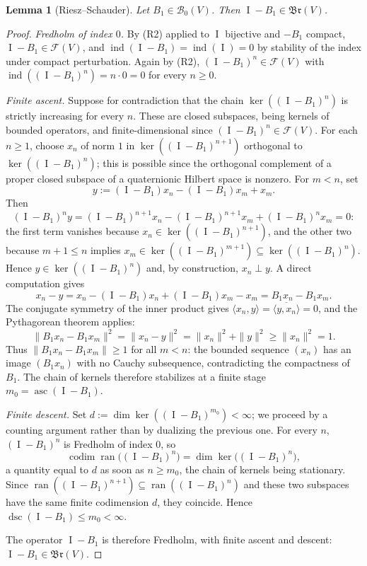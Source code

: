\documentclass[11pt,a4paper]{article}
\theoremstyle{plain}
\newtheorem{lemma}{Lemma}[section]
\theoremstyle{remark}
\newcommand{\V}{V}
\newcommand{\Bo}{\mathcal B_0}
\newcommand{\F}{\mathcal F}
\newcommand{\Br}{\mathfrak{Br}}
\DeclareMathOperator{\ran}{ran}
\DeclareMathOperator{\asc}{asc}
\DeclareMathOperator{\dsc}{dsc}
\DeclareMathOperator{\ind}{ind}
\DeclareMathOperator{\Id}{I}
\DeclareMathOperator{\codim}{codim}
\begin{document}
\begin{lemma}[Riesz--Schauder]\label{lem:RS}
Let $B_1\in\Bo(\V)$. Then $\Id-B_1\in\Br(\V)$.
\end{lemma}

\begin{proof}
\emph{Fredholm of index $0$.} By (R2) applied to $\Id$ bijective and $-B_1$ compact, $\Id-B_1\in\F(\V)$, and $\ind(\Id-B_1)=\ind(\Id)=0$ by stability of the index under compact perturbation. Again by (R2), $(\Id-B_1)^n\in\F(\V)$ with $\ind((\Id-B_1)^n)=n\cdot0=0$ for every $n\ge0$.

\emph{Finite ascent.} Suppose for contradiction that the chain $\ker((\Id-B_1)^n)$ is strictly increasing for every $n$. These are closed subspaces, being kernels of bounded operators, and finite-dimensional since $(\Id-B_1)^n\in\F(\V)$. For each $n\ge1$, choose $x_n$ of norm $1$ in $\ker((\Id-B_1)^{n+1})$ orthogonal to $\ker((\Id-B_1)^n)$; this is possible since the orthogonal complement of a proper closed subspace of a quaternionic Hilbert space is nonzero. For $m<n$, set
\[
y:=(\Id-B_1)x_n-(\Id-B_1)x_m+x_m.
\]
Then
\[
(\Id-B_1)^n y=(\Id-B_1)^{n+1}x_n-(\Id-B_1)^{n+1}x_m+(\Id-B_1)^n x_m=0:
\]
the first term vanishes because $x_n\in\ker((\Id-B_1)^{n+1})$, and the other two because $m+1\le n$ implies $x_m\in\ker((\Id-B_1)^{m+1})\subseteq\ker((\Id-B_1)^n)$. Hence $y\in\ker((\Id-B_1)^n)$ and, by construction, $x_n\perp y$. A direct computation gives
\[
x_n-y=x_n-(\Id-B_1)x_n+(\Id-B_1)x_m-x_m=B_1x_n-B_1x_m.
\]
The conjugate symmetry of the inner product gives $\langle x_n,y\rangle=\overline{\langle y,x_n\rangle}=0$, and the Pythagorean theorem applies:
\[
\|B_1x_n-B_1x_m\|^2=\|x_n-y\|^2=\|x_n\|^2+\|y\|^2\ge\|x_n\|^2=1.
\]
Thus $\|B_1x_n-B_1x_m\|\ge1$ for all $m<n$: the bounded sequence $(x_n)$ has an image $(B_1x_n)$ with no Cauchy subsequence, contradicting the compactness of $B_1$. The chain of kernels therefore stabilizes at a finite stage $m_0=\asc(\Id-B_1)$.

\emph{Finite descent.} Set $d:=\dim\ker((\Id-B_1)^{m_0})<\infty$; we proceed by a counting argument rather than by dualizing the previous one. For every $n$, $(\Id-B_1)^n$ is Fredholm of index $0$, so
\[
\codim\ran\big((\Id-B_1)^n\big)=\dim\ker\big((\Id-B_1)^n\big),
\]
a quantity equal to $d$ as soon as $n\ge m_0$, the chain of kernels being stationary. Since $\ran((\Id-B_1)^{n+1})\subseteq\ran((\Id-B_1)^n)$ and these two subspaces have the same finite codimension $d$, they coincide. Hence $\dsc(\Id-B_1)\le m_0<\infty$.

The operator $\Id-B_1$ is therefore Fredholm, with finite ascent and descent: $\Id-B_1\in\Br(\V)$.
\end{proof}
\end{document}
